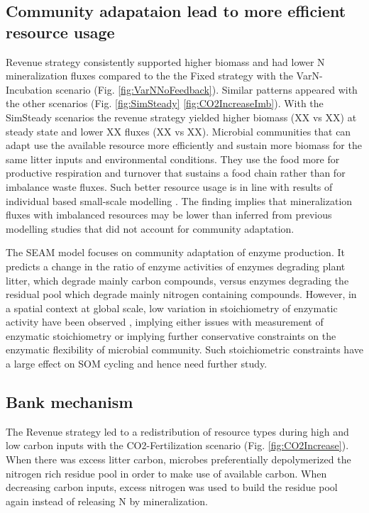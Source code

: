 \subsection{Community adapataion lead to more efficient resource usage} 
Revenue strategy consistently supported higher biomass and had
lower N mineralization fluxes compared to the the Fixed strategy with the
VarN-Incubation scenario (Fig. \ref{fig:VarNNoFeedback}). Similar patterns
appeared with the other scenarios (Fig. \ref{fig:SimSteady}
\ref{fig:CO2IncreaseImb}). With the SimSteady scenarios the revenue strategy
yielded higher biomass (XX vs XX) at steady state and lower XX fluxes (XX vs
XX).
Microbial communities that can adapt use
the available resource more efficiently and sustain more biomass for the same litter inputs and
environmental conditions. They use the food more for productive respiration and
turnover that sustains a food chain rather than for imbalance waste fluxes.
Such better resource usage is in line with results of individual based
small-scale modelling \citep{Kaiser14}.
 The finding implies that mineralization fluxes with imbalanced resources may
be lower than inferred from previous modelling studies that did not account for community
adaptation.

The SEAM model focuses on community adaptation of enzyme production. It predicts
a change in the ratio of enzyme activities of enzymes degrading plant litter,
which degrade mainly carbon compounds, versus enzymes degrading the residual
pool which degrade mainly nitrogen containing compounds.
However, in a spatial context at global scale, low variation in stoichiometry of
enzymatic activity have been observed \citep{Sinsabaugh09}, implying either
issues with measurement of enzymatic stoichiometry or implying further
conservative constraints on the enzymatic flexibility of microbial community.
Such stoichiometric constraints have a large effect on SOM cycling and hence
need further study.

\subsection{Bank mechanism}
The Revenue strategy led to a redistribution of resource types during high
and low carbon inputs with the  CO2-Fertilization scenario (Fig.
\ref{fig:CO2Increase}). When there was excess litter carbon, microbes
preferentially depolymerized the nitrogen rich residue pool in order to make use of available
carbon. When decreasing carbon inputs, excess nitrogen was used to
build the residue pool again instead of releasing N by mineralization.

